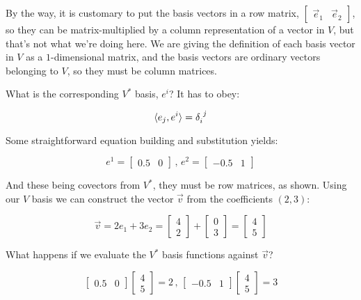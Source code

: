 By the way, it is customary to put the basis vectors in a row matrix, $\begin{bmatrix}\vec{e}_1 & \vec{e}_2\end{bmatrix}$, so they can be matrix-multiplied by a column representation of a vector in $V$, but that's not what we're doing here. We are giving the definition of each basis vector in $V$ as a $1$-dimensional matrix, and the basis vectors are ordinary vectors belonging to $V$, so they must be column matrices.

What is the corresponding $V^*$ basis, $e^i$? It has to obey:

$$
\langle e_j,e^i \rangle = \delta \indices{_i^j}
$$

Some straightforward equation building and substitution yields:

$$
e^1 = \begin{bmatrix}0.5 & 0\end{bmatrix}\,,\,
e^2 = \begin{bmatrix}-0.5 & 1\end{bmatrix}
$$

And these being covectors from $V^*$, they must be row matrices, as shown. Using our $V$ basis we can construct the vector $\vec{v}$ from the coefficients $(2, 3)$:

$$
\vec{v} = 2e_1 + 3e_2
        = \begin{bmatrix}4 \\ 2\end{bmatrix} + \begin{bmatrix}0 \\ 3\end{bmatrix} 
        = \begin{bmatrix}4 \\ 5\end{bmatrix}
$$

What happens if we evaluate the $V^*$ basis functions against $\vec{v}$?

$$
\begin{bmatrix}0.5 & 0\end{bmatrix} \begin{bmatrix}4 \\ 5\end{bmatrix} = 2 
\,,\,
\begin{bmatrix}-0.5 & 1\end{bmatrix} \begin{bmatrix}4 \\ 5\end{bmatrix} = 3
$$

